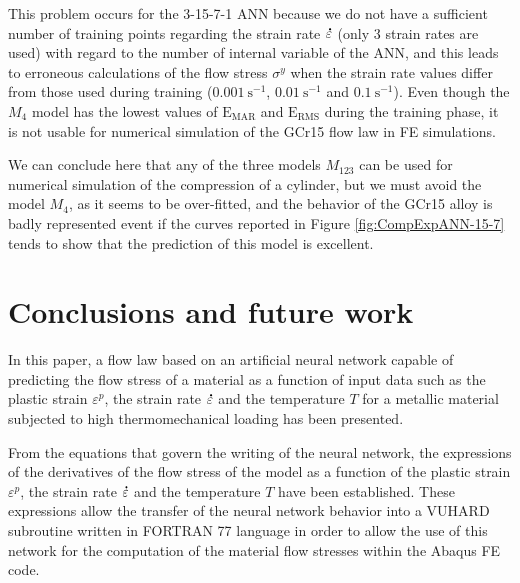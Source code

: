 \documentclass[algorithms,article,submit,pdftex,moreauthors]{Definitions/mdpi}
\DeclareRobustCommand{\mdot}[1]{\accentset{\mbox{\bfseries .}}{#1}}
\DeclareRobustCommand{\RMSE}{\text{E}_\text{RMS}}
\DeclareRobustCommand{\MARE}{\text{E}_\text{MAR}}
\DeclareRobustCommand{\ps}{\text{s}^{-1}}
\begin{document}
This problem occurs for the 3-15-7-1 ANN because we do not have a sufficient number of training points regarding the strain rate $\mdot\varepsilon$ (only 3 strain rates are used) with regard to the number of internal variable of the ANN, and this leads to erroneous calculations of the flow stress $\sigma^y$ when the strain rate values differ from those used during training ($0.001~\ps$, $0.01~\ps$ and $0.1~\ps$).
Even though the $M_4$ model has the lowest values of $\MARE$ and $\RMSE$ during the training phase, it is not usable for numerical simulation of the GCr15 flow law in FE simulations.

We can conclude here that any of the three models $M_{123}$ can be used for numerical simulation of the compression of a cylinder, but we must avoid the model $M_4$, as it seems to be over-fitted, and the behavior of the GCr15 alloy is badly represented event if the curves reported in Figure \ref{fig:CompExpANN-15-7} tends to show that the prediction of this model is excellent.

\section{Conclusions and future work}\label{sec:Conclusions}

In this paper, a flow law based on an artificial neural network capable of predicting the flow stress of a material as a function of input data such as the plastic strain $\varepsilon^p$, the strain rate $\mdot\varepsilon$ and the temperature $T$ for a metallic material subjected to high thermomechanical loading has been presented.

From the equations that govern the writing of the neural network, the expressions of the derivatives of the flow stress of the model as a function of the plastic strain $\varepsilon^p$, the strain rate $\mdot\varepsilon$ and the temperature $T$ have been established.
These expressions allow the transfer of the neural network behavior into a VUHARD subroutine written in FORTRAN 77 language in order to allow the use of this network for the computation of the material flow stresses within the Abaqus FE code.
\end{document}
